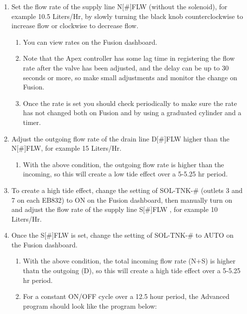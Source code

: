 \documentclass[
]{book}
\providecommand{\tightlist}{%
  \setlength{\itemsep}{0pt}\setlength{\parskip}{0pt}}
\begin{document}
\begin{enumerate}
\def\labelenumi{\arabic{enumi}.}
\tightlist
\item
  Set the flow rate of the supply line N{[}\#{]}FLW (without the solenoid), for example 10.5 Liters/Hr, by slowly turning the black knob counterclockwise to increase flow or clockwise to decrease flow.

  \begin{enumerate}
  \def\labelenumii{\arabic{enumii}.}
  \tightlist
  \item
    You can view rates on the Fusion dashboard.
  \item
    Note that the Apex controller has some lag time in registering the flow rate after the valve has been adjusted, and the delay can be up to 30 seconds or more, so make small adjustments and monitor the change on Fusion.
  \item
    Once the rate is set you should check periodically to make sure the rate has not changed both on Fusion and by using a graduated cylinder and a timer.
  \end{enumerate}
\item
  Adjust the outgoing flow rate of the drain line D{[}\#{]}FLW higher than the N{[}\#{]}FLW, for example 15 Liters/Hr.

  \begin{enumerate}
  \def\labelenumii{\arabic{enumii}.}
  \tightlist
  \item
    With the above condition, the outgoing flow rate is higher than the incoming, so this will create a low tide effect over a 5-5.25 hr period.
  \end{enumerate}
\item
  To create a high tide effect, change the setting of SOL-TNK-\# (outlets 3 and 7 on each EB832) to ON on the Fusion dashboard, then manually turn on and adjust the flow rate of the supply line S{[}\#{]}FLW , for example 10 Liters/Hr.\\
\item
  Once the S{[}\#{]}FLW is set, change the setting of SOL-TNK-\# to AUTO on the Fusion dashboard.

  \begin{enumerate}
  \def\labelenumii{\arabic{enumii}.}
  \tightlist
  \item
    With the above condition, the total incoming flow rate (N+S) is higher thatn the outgoing (D), so this will create a high tide effect over a 5-5.25 hr period.
  \item
    For a constant ON/OFF cycle over a 12.5 hour period, the Advanced program should look like the program below:
  \end{enumerate}
\end{enumerate}
\end{document}
